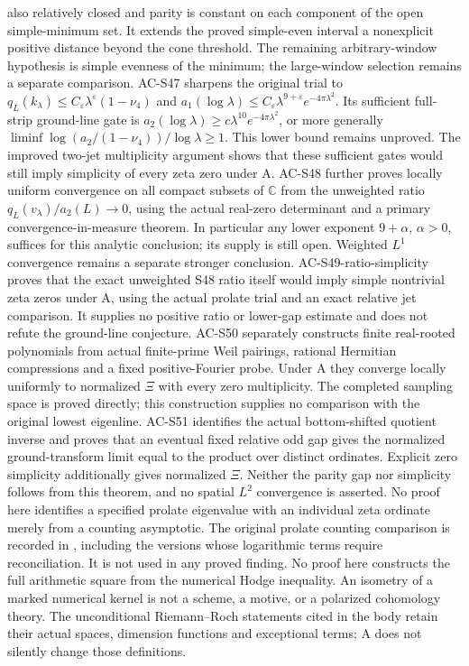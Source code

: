 \documentclass[11pt,a4paper]{article}
\theoremstyle{definition}
\theoremstyle{remark}
\begin{document}
also relatively closed and parity is constant on each component
of the open simple-minimum set. It extends the proved simple-even
interval a nonexplicit positive distance beyond the cone threshold.
The remaining arbitrary-window hypothesis is
simple evenness of the minimum; the large-window selection remains
a separate comparison.
AC-S47 sharpens the original trial to $q_L(k_\lambda)\le C_\varepsilon\lambda^\varepsilon(1-\nu_4)$ and $a_1(\log\lambda)\le C_\varepsilon\lambda^{9+\varepsilon}e^{-4\pi\lambda^2}$. Its sufficient full-strip ground-line gate is $a_2(\log\lambda)\ge c\lambda^{10}e^{-4\pi\lambda^2}$, or more generally $\liminf\log(a_2/(1-\nu_4))/\log\lambda\ge1$. This lower bound remains unproved. The improved two-jet multiplicity argument shows that these sufficient gates would still imply simplicity of every zeta zero under A. AC-S48 further proves locally uniform convergence on all compact subsets of $\mathbb C$ from the unweighted ratio $q_L(v_\lambda)/a_2(L)\to0$, using the actual real-zero determinant and a primary convergence-in-measure theorem. In particular any lower exponent $9+\alpha$, $\alpha>0$, suffices for this analytic conclusion; its supply is still open. Weighted $L^1$ convergence remains a separate stronger conclusion. AC-S49-ratio-simplicity proves that the exact unweighted S48 ratio itself would imply simple nontrivial zeta zeros under A, using the actual prolate trial and an exact relative jet comparison. It supplies no positive ratio or lower-gap estimate and does not refute the ground-line conjecture. AC-S50 separately constructs finite real-rooted polynomials from actual finite-prime Weil pairings, rational Hermitian compressions and a fixed positive-Fourier probe. Under A they converge locally uniformly to normalized $\Xi$ with every zero multiplicity. The completed sampling space is proved directly; this construction supplies no comparison with the original lowest eigenline. AC-S51 identifies the actual bottom-shifted quotient inverse and proves that an eventual fixed relative odd gap gives the normalized ground-transform limit equal to the product over distinct ordinates. Explicit zero simplicity additionally gives normalized $\Xi$. Neither the parity gap nor simplicity follows from this theorem, and no spatial $L^2$ convergence is asserted.
No proof here identifies a specified prolate eigenvalue
with an individual zeta ordinate merely from a counting
asymptotic. The original prolate counting comparison is
recorded in ,
including the versions whose logarithmic terms require
reconciliation. It is not used in any proved finding.
No proof here constructs the full arithmetic square
from the numerical Hodge inequality. An isometry of a
marked numerical kernel is not a scheme, a motive, or
a polarized cohomology theory. The unconditional
Riemann--Roch statements cited in the body retain their
actual spaces, dimension functions and exceptional
terms; A does not silently change those definitions.
\end{document}
